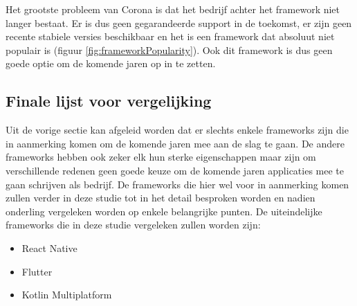 Het grootste probleem van Corona is dat het bedrijf achter het framework niet langer bestaat. Er is dus geen gegarandeerde support in de toekomst, er zijn geen recente stabiele versies beschikbaar en het is een framework dat absoluut niet populair is (figuur \ref{fig:frameworkPopularity}). Ook dit framework is dus geen goede optie om de komende jaren op in te zetten.

\subsection{Finale lijst voor vergelijking}
\label{subsec:finaleLijst}

Uit de vorige sectie kan afgeleid worden dat er slechts enkele frameworks zijn die in aanmerking komen om de komende jaren mee aan de slag te gaan. De andere frameworks hebben ook zeker elk hun sterke eigenschappen maar zijn om verschillende redenen geen goede keuze om de komende jaren applicaties mee te gaan schrijven als bedrijf. De frameworks die hier wel voor in aanmerking komen zullen verder in deze studie tot in het detail besproken worden en nadien onderling vergeleken worden op enkele belangrijke punten. De uiteindelijke frameworks die in deze studie vergeleken zullen worden zijn:

\begin{itemize}
    \item React Native
    \item Flutter
    \item Kotlin Multiplatform
\end{itemize}


